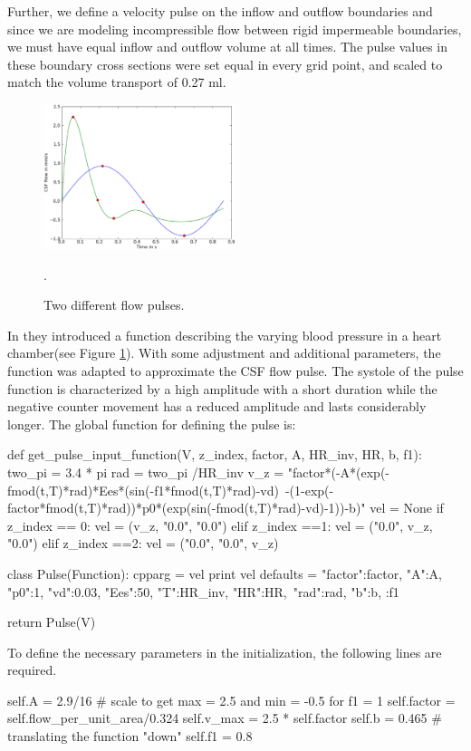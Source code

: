 Further, we define a velocity pulse on the inflow and outflow
boundaries and since we are modeling incompressible flow between rigid
impermeable boundaries, we must have equal inflow and outflow volume
at all times. The pulse values in these boundary cross sections were
set equal in every grid point, and scaled to match the volume
transport of 0.27 ml.

\begin{figure}\begin{center}
\includegraphics[width = 0.5\textwidth]{chapters/hentschel/eps/sin_pulse.eps}
\caption{Two different flow pulses.}
\label{fig:sin_pulse}. 
\end{center}\end{figure}

In \cite{Smith2006} they introduced a function describing the varying blood pressure in a heart chamber(see Figure \ref{fig:sin_pulse}). With some adjustment and additional parameters, the function was adapted to approximate the CSF flow pulse. The systole of the pulse function is characterized by a high amplitude with a short duration while the negative counter movement has a reduced amplitude and lasts considerably longer. 
The global function for defining the pulse is:
\begin{code}
def get_pulse_input_function(V, z_index, factor, A, HR_inv, HR, b, f1):
	two_pi = 3.4 * pi
	rad = two_pi /HR_inv	
	v_z = "factor*(-A*(exp(-fmod(t,T)*rad)*Ees*(sin(-f1*fmod(t,T)*rad)-vd)\
          -(1-exp(-factor*fmod(t,T)*rad))*p0*(exp(sin(-fmod(t,T)*rad)-vd)-1))-b)"
	vel = None
	if z_index == 0:
		vel = (v_z, "0.0", "0.0")
	elif z_index ==1:
		vel = ("0.0", v_z, "0.0")
	elif z_index ==2:
		vel = ("0.0", "0.0", v_z)

	class Pulse(Function):
		cpparg = vel
		print vel
		defaults = {"factor":factor, "A":A, "p0":1, "vd":0.03, "Ees":50, "T":HR_inv, "HR":HR,\
                     "rad":rad, "b":b, :f1}

	return Pulse(V)
\end{code}
To define the necessary parameters in the initialization, the following lines are required.
\begin{code}
self.A = 2.9/16	# scale to get max = 2.5 and min = -0.5 for f1 = 1
self.factor = self.flow_per_unit_area/0.324		
self.v_max = 2.5 * self.factor
self.b = 0.465 	# translating the function "down"
self.f1 = 0.8
\end{code}

